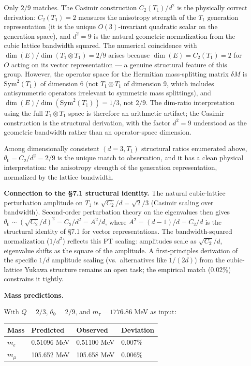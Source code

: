 \documentclass[
]{article}
\begin{document}
Only \(2/9\) matches. The Casimir construction \(C_2(T_1)/d^2\) is the
physically correct derivation: \(C_2(T_1) = 2\) measures the anisotropy
strength of the \(T_1\) generation representation (it is the unique
\(O(3)\)-invariant quadratic scalar on the generation space), and
\(d^2 = 9\) is the natural geometric normalization from the cubic
lattice bandwidth squared. The numerical coincidence with
\(\dim(E)/\dim(T_1 \otimes T_1) = 2/9\) arises because
\(\dim(E) = C_2(T_1) = 2\) for \(O\) acting on its vector representation
--- a genuine structural feature of this group. However, the operator
space for the Hermitian mass-splitting matrix \(\delta M\) is
\(\text{Sym}^2(T_1)\) of dimension 6 (not \(T_1 \otimes T_1\) of
dimension 9, which includes antisymmetric operators irrelevant to
symmetric mass splittings), and
\(\dim(E)/\dim(\text{Sym}^2(T_1)) = 1/3\), not \(2/9\). The dim-ratio
interpretation using the full \(T_1 \otimes T_1\) space is therefore an
arithmetic artifact; the Casimir construction is the structural
derivation, with the factor \(d^2 = 9\) understood as the geometric
bandwidth rather than an operator-space dimension.

Among dimensionally consistent \((d=3, T_1)\) structural ratios
enumerated above, \(\theta_0 = C_2/d^2 = 2/9\) is the unique match to
observation, and it has a clean physical interpretation: the anisotropy
strength of the generation representation, normalized by the lattice
bandwidth.

\textbf{Connection to the §7.1 structural identity.} The natural
cubic-lattice perturbation amplitude on \(T_1\) is
\(\sqrt{C_2}/d = \sqrt{2}/3\) (Casimir scaling over bandwidth).
Second-order perturbation theory on the eigenvalues then gives
\(\theta_0 \sim (\sqrt{C_2}/d)^2 = C_2/d^2 = A^2/d\), where
\(A^2 = (d-1)/d = C_2/d\) is the structural identity of §7.1 for vector
representations. The bandwidth-squared normalization (\(1/d^2\))
reflects this PT scaling: amplitudes scale as \(\sqrt{C_2}/d\),
eigenvalue shifts as the square of the amplitude. A first-principles
derivation of the specific \(1/d\) amplitude scaling (vs.~alternatives
like \(1/(2d)\)) from the cubic-lattice Yukawa structure remains an open
task; the empirical match (0.02\%) constrains it tightly.

\textbf{Mass predictions.}

With \(Q = 2/3\), \(\theta_0 = 2/9\), and \(m_\tau = 1776.86\) MeV as
input:

\begin{longtable}[]{@{}llll@{}}
\toprule\noalign{}
Mass & Predicted & Observed & Deviation \\
\midrule\noalign{}
\endhead
\bottomrule\noalign{}
\endlastfoot
\(m_e\) & 0.51096 MeV & 0.51100 MeV & 0.007\% \\
\(m_\mu\) & 105.652 MeV & 105.658 MeV & 0.006\% \\
\end{longtable}
\end{document}
